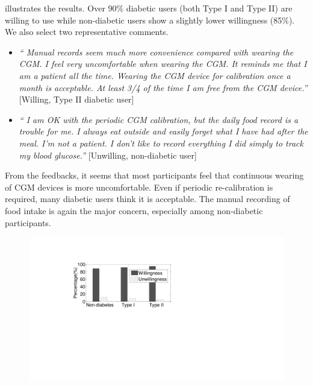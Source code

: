 { illustrates the results.
Over 90\% diabetic users (both Type I and Type II) are willing to use \sysname while non-diabetic users show a slightly lower willingness (85\%).
We also select two representative comments.
\begin{itemize}
  \item
  \textit{``
  Manual records seem much more convenience compared with wearing the CGM.
  I feel very uncomfortable when wearing the CGM.
  It reminds me that I am a patient all the time.
  Wearing the CGM device for calibration once a month is acceptable.
  At least 3/4 of the time I am free from the CGM device.''}
  [Willing, Type II diabetic user]
  \item
  \textit{``
  I am OK with the periodic CGM calibration, but the daily food record is a trouble for me.
  I always eat outside and easily forget what I have had after the meal.
  I'm not a patient.
  I don't like to record everything I did simply to track my blood glucose.''}
  [Unwilling, non-diabetic user]
\end{itemize}
From the feedbacks, it seems that most participants feel that continuous wearing of CGM devices is more uncomfortable.
Even if periodic re-calibration is required, many diabetic users think it is acceptable.
The manual recording of food intake is again the major concern, especially among non-diabetic participants.

\begin{figure}[h]
  \centering
  \includegraphics[width=0.4\columnwidth]{./img/willingness.pdf}
  \caption{}
  \label{fig:user_willingness}
\end{figure}


}
